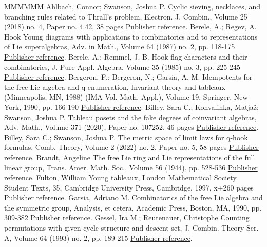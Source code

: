 \documentclass[11pt]{article}
\theoremstyle{definition}
\numberwithin{equation}{section}
\begin{document}
\begin{thebibliography}{MMMMMM}
 Ahlbach, Connor; Swanson, Joshua P. Cyclic sieving, necklaces, and branching rules related to Thrall’s problem, Electron. J. Combin., Volume 25 (2018) no. 4, Paper no. 4.42, 38 pages \href{https://alco.centre-mersenne.org/articles/10.5802/alco.421/#AS}{Publisher reference}.
 Berele, A.; Regev, A. Hook Young diagrams with applications to combinatorics and to representations of Lie superalgebras, Adv. in Math., Volume 64 (1987) no. 2, pp. 118-175 \href{https://alco.centre-mersenne.org/articles/10.5802/alco.421/#BReg}{Publisher reference}.
 Berele, A.; Remmel, J. B. Hook flag characters and their combinatorics, J. Pure Appl. Algebra, Volume 35 (1985) no. 3, pp. 225-245 \href{https://alco.centre-mersenne.org/articles/10.5802/alco.421/#BRem}{Publisher reference}.
 Bergeron, F.; Bergeron, N.; Garsia, A. M. Idempotents for the free Lie algebra and q-enumeration, Invariant theory and tableaux (Minneapolis, MN, 1988) (IMA Vol. Math. Appl.), Volume 19, Springer, New York, 1990, pp. 166-190 \href{https://alco.centre-mersenne.org/articles/10.5802/alco.421/#BBG}{Publisher reference}.
 Billey, Sara C.; Konvalinka, Matjaž; Swanson, Joshua P. Tableau posets and the fake degrees of coinvariant algebras, Adv. Math., Volume 371 (2020), Paper no. 107252, 46 pages \href{https://alco.centre-mersenne.org/articles/10.5802/alco.421/#BKS}{Publisher reference}.
 Billey, Sara C.; Swanson, Joshua P. The metric space of limit laws for q-hook formulas, Comb. Theory, Volume 2 (2022) no. 2, Paper no. 5, 58 pages \href{https://alco.centre-mersenne.org/articles/10.5802/alco.421/#BS}{Publisher reference}.
 Brandt, Angeline The free Lie ring and Lie representations of the full linear group, Trans. Amer. Math. Soc., Volume 56 (1944), pp. 528-536 \href{https://alco.centre-mersenne.org/articles/10.5802/alco.421/#Brandt}{Publisher reference}.
 Fulton, William Young tableaux, London Mathematical Society Student Texts, 35, Cambridge University Press, Cambridge, 1997, x+260 pages \href{https://alco.centre-mersenne.org/articles/10.5802/alco.421/#Ful}{Publisher reference}.
 Garsia, Adriano M. Combinatorics of the free Lie algebra and the symmetric group, Analysis, et cetera, Academic Press, Boston, MA, 1990, pp. 309-382 \href{https://alco.centre-mersenne.org/articles/10.5802/alco.421/#Gar}{Publisher reference}.
 Gessel, Ira M.; Reutenauer, Christophe Counting permutations with given cycle structure and descent set, J. Combin. Theory Ser. A, Volume 64 (1993) no. 2, pp. 189-215 \href{https://alco.centre-mersenne.org/articles/10.5802/alco.421/#GR}{Publisher reference}.

\end{thebibliography}
\end{document}
